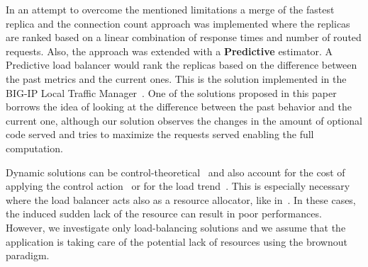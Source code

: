 In an attempt to overcome the mentioned limitations a merge of the
fastest replica and the connection count approach was implemented
where the replicas are ranked based on a linear combination of
response times and number of routed requests. Also, the approach was
extended with a \textbf{Predictive} estimator. A Predictive load
balancer would rank the replicas based on the difference between the
past metrics and the current ones. This is the solution implemented in
the BIG-IP Local Traffic Manager~\cite{BIGIP}. One of the solutions
proposed in this paper borrows the idea of looking at the difference
between the past behavior and the current one, although our solution
observes the changes in the amount of optional code served and tries
to maximize the requests served enabling the full computation.

Dynamic solutions can be
control-theoretical~\cite{multipathctlb,comparisonstaticdynamic} and
also account for the cost of applying the control
action~\cite{costofcontrol} or for the load trend~\cite{CasolariSA}.
This is especially necessary where the load balancer acts also as a
resource allocator, like in~\cite{Ardagnaalltogether}. In these cases,
the induced sudden lack of the resource can result in poor
performances. However, we investigate only load-balancing solutions
and we assume that the application is taking care of the potential
lack of resources using the brownout paradigm.

